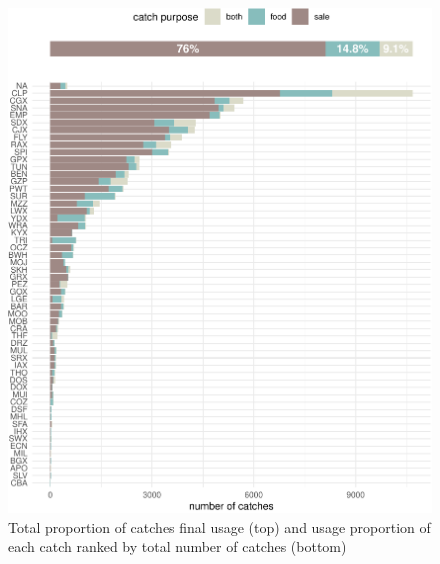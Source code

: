 \documentclass[
]{article}
\begin{document}
\begin{figure}
\includegraphics[width=1\linewidth,height=1\textheight]{data_report_files/figure-latex/unnamed-chunk-4-1} \caption{Total proportion of catches final usage (top) and usage proportion of each catch ranked by total number of catches (bottom)}\label{fig:unnamed-chunk-4}
\end{figure}
\end{document}
